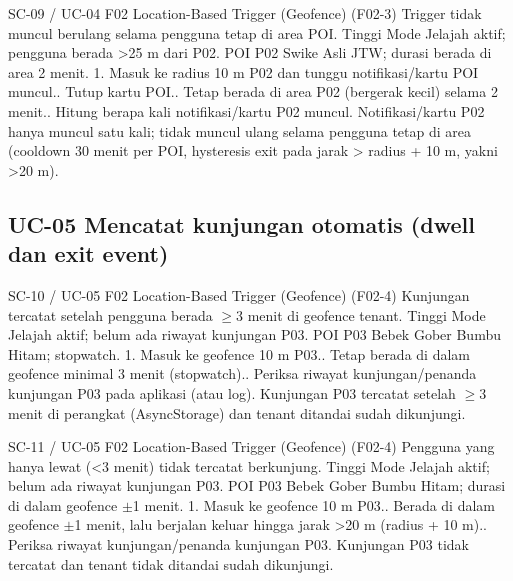 \renewcommand{\tcactual}{Sesuai ekspektasi pada perangkat Android (Cooldown \& hysteresis lolos (\texttt{01-geofence})). Notifikasi/kartu P02 hanya muncul satu kali; tidak muncul ulang selama pengguna tetap di area (cooldown 30 menit per POI, hysteresis exit pada jarak > radius + 10 m, yakni >20 m).}
{SC-09 / UC-04}
{F02 Location-Based Trigger (Geofence)}
{(F02-3) Trigger tidak muncul berulang selama pengguna tetap di area POI.}
{Tinggi}
{Mode Jelajah aktif; pengguna berada >25 m dari P02.}
{POI P02 Swike Asli JTW; durasi berada di area 2 menit.}
{1. Masuk ke radius 10 m P02 dan tunggu notifikasi/kartu POI muncul.. Tutup kartu POI.. Tetap berada di area P02 (bergerak kecil) selama 2 menit.. Hitung berapa kali notifikasi/kartu P02 muncul.}
{Notifikasi/kartu P02 hanya muncul satu kali; tidak muncul ulang selama pengguna tetap di area (cooldown 30 menit per POI, hysteresis exit pada jarak > radius + 10 m, yakni >20 m).}

\subsection*{UC-05 Mencatat kunjungan otomatis (dwell dan exit event)}

\renewcommand{\tcactual}{Sesuai ekspektasi pada perangkat Android (Logika dwell \(\ge\)3 mnt lolos (\texttt{01-geofence})). Kunjungan P03 tercatat setelah \(\ge\)3 menit di perangkat (AsyncStorage) dan tenant ditandai sudah dikunjungi.}
{SC-10 / UC-05}
{F02 Location-Based Trigger (Geofence)}
{(F02-4) Kunjungan tercatat setelah pengguna berada \(\ge\)3 menit di geofence tenant.}
{Tinggi}
{Mode Jelajah aktif; belum ada riwayat kunjungan P03.}
{POI P03 Bebek Gober Bumbu Hitam; stopwatch.}
{1. Masuk ke geofence 10 m P03.. Tetap berada di dalam geofence minimal 3 menit (stopwatch).. Periksa riwayat kunjungan/penanda kunjungan P03 pada aplikasi (atau log).}
{Kunjungan P03 tercatat setelah \(\ge\)3 menit di perangkat (AsyncStorage) dan tenant ditandai sudah dikunjungi.}

\renewcommand{\tcactual}{Sesuai ekspektasi pada perangkat Android (Logika dwell <3 mnt lolos (\texttt{01-geofence})). Kunjungan P03 tidak tercatat dan tenant tidak ditandai sudah dikunjungi.}
{SC-11 / UC-05}
{F02 Location-Based Trigger (Geofence)}
{(F02-4) Pengguna yang hanya lewat (<3 menit) tidak tercatat berkunjung.}
{Tinggi}
{Mode Jelajah aktif; belum ada riwayat kunjungan P03.}
{POI P03 Bebek Gober Bumbu Hitam; durasi di dalam geofence \(\pm\)1 menit.}
{1. Masuk ke geofence 10 m P03.. Berada di dalam geofence \(\pm\)1 menit, lalu berjalan keluar hingga jarak >20 m (radius + 10 m).. Periksa riwayat kunjungan/penanda kunjungan P03.}
{Kunjungan P03 tidak tercatat dan tenant tidak ditandai sudah dikunjungi.}

